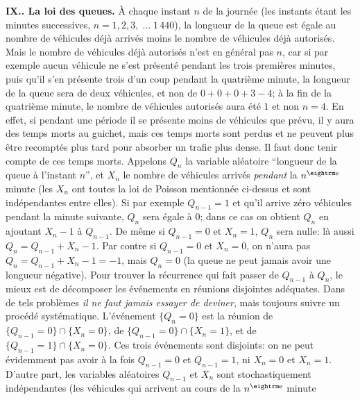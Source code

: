 \bigskip 
 
{\bf IX.. La loi des queues.} 
 \medskip 
\`A chaque instant $n$ de la journ\'ee (les instants \'etant les minutes  
successives, $n = 1,2,3, \;\ldots\; 1\, 440$), la longueur de la queue  est 
\'egale au nombre de v\'ehicules  d\'ej\`a arriv\'es moins le nombre  de 
v\'ehicules d\'ej\`a autoris\'es. Mais le nombre de v\'ehicules d\'ej\`a 
autoris\'es n'est en g\'en\'eral  pas $n$, car si par exemple aucun 
v\'ehicule ne s'est pr\'esent\'e pendant les trois premi\`eres minutes, puis 
qu'il s'en pr\'esente trois d'un coup pendant la quatri\`eme minute, la 
longueur de la queue sera de deux v\'ehicules, et non de $0 + 0 + 0 + 3 - 4$; 
\`a la fin de la quatri\`eme minute, le nombre de v\'ehicules autoris\'es 
aura \'et\'e $1$ et non $n = 4$. En effet, si pendant une p\'eriode il se 
pr\'esente moins de v\'ehicules que pr\'evu, il y aura des temps morts au 
guichet, mais ces temps morts sont perdus et ne peuvent plus \^etre 
recompt\'es plus tard pour absorber un trafic plus dense. Il faut donc  
tenir compte de ces temps morts. 
\medskip 
Appelons $Q_n$ la variable al\'eatoire ``longueur de la queue \`a  
l'instant $n$'', et $X_n$ le nombre de v\'ehicules arriv\'es {\it pendant} 
la $n^{\rm e}$ minute (les $X_n$ ont toutes la loi de Poisson 
mentionn\'ee ci-dessus et sont ind\'ependantes entre elles). Si par 
exemple $Q_{n-1} = 1$ et qu'il  arrive z\'ero v\'ehicules pendant la 
minute suivante, $Q_n$ sera \'egale \`a $0$; dans ce cas on obtient 
$Q_n$ en ajoutant $X_n - 1$ \`a $Q_{n-1}$. De m\^eme si $Q_{n-1} = 0$  
et $X_n = 1$, $Q_n$ sera nulle: l\`a aussi $Q_n = Q_{n-1} + X_n  
- 1$. Par contre si $Q_{n-1} = 0$ et $X_n = 0$, on n'aura pas $Q_n = 
Q_{n-1} + X_n - 1 = -1$, mais $Q_n = 0$ (la queue ne peut jamais avoir 
une longueur n\'egative). Pour trouver la r\'ecurrence qui fait passer de  
$Q_{n-1}$ \`a $Q_n$, le mieux est de d\'ecomposer les \'ev\'enements  
en r\'eunions disjointes ad\'equates. Dans de tels probl\`emes {\it il ne 
faut jamais essayer de deviner},  mais toujours suivre un proc\'ed\'e 
syst\'ematique.   
\medskip 
L'\'ev\'enement $\{ Q_n = 0 \}$ est la r\'eunion de $\{ Q_{n-1} = 0 \}  
\cap  \{ X_n = 0 \}$, de $\{ Q_{n-1} = 0 \} \cap \{ X_n = 1 \}$, et de $\{ 
Q_{n-1} = 1 \} \cap \{ X_n = 0 \}$. Ces trois \'ev\'enements sont 
disjoints: on ne peut \'evidemment pas avoir \`a la fois $Q_{n-1} = 0$ et 
$Q_{n-1} = 1$, ni $X_n = 0$ et $X_n = 1$. D'autre part, les variables 
al\'eatoires $Q_{n-1}$ et $X_n$ sont stochastiquement ind\'ependantes 
(les v\'ehicules qui arrivent au cours de la $n^{\rm e}$ minute 
